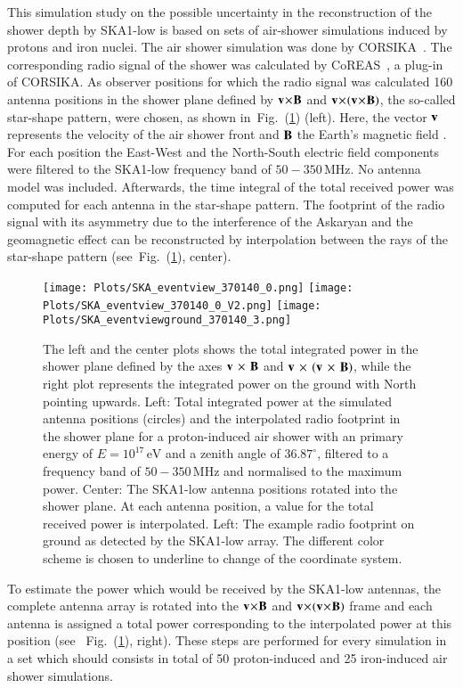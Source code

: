 \documentclass[epj]{webofc}
\newcommand*{\figref}[1]{Fig.~(\ref{fig:#1})}
\newcommand*{\figlab}[1]{\label{fig:#1}}
\begin{document}
This simulation study on the possible uncertainty in the reconstruction of the shower depth by SKA1-low is based on sets of air-shower simulations induced by protons and iron nuclei. The air shower simulation was done by CORSIKA~\cite{CORSIKA}. The corresponding radio signal of the shower was calculated by CoREAS~\cite{CoREAS}, a plug-in of CORSIKA. 
As observer positions for which the radio signal was calculated 160 antenna positions in the shower plane defined by $\bf v\!\times\!\bf B$ and $\bf v\!\times\!(\bf v\!\times\!\bf B)$, the so-called star-shape pattern, were chosen, as shown in~\figref{fig-1} (left). Here, the vector $\bf v$ represents the velocity of the air shower front and $\bf B$ the Earth's magnetic field .
For each position the East-West and the North-South electric field components were filtered to the SKA1-low frequency band of $50-350\,\mbox{MHz}$. No antenna model was included. Afterwards, the time integral of the total received power was computed for each antenna in the star-shape pattern. 
The footprint of the radio signal with its asymmetry due to the interference of the Askaryan and the geomagnetic effect can be reconstructed by interpolation between the rays of the star-shape pattern (see~\figref{fig-1}, center). 
%
\begin{figure}[tb]
\centering
\texttt{[image: Plots/SKA\_eventview\_370140\_0.png]}
\texttt{[image: Plots/SKA\_eventview\_370140\_0\_V2.png]}
\texttt{[image: Plots/SKA\_eventviewground\_370140\_3.png]}%
\caption{The left and the center plots shows the total integrated power in the shower plane defined by the axes $\bf v\,\times\,\bf B$ and $\bf v\,\times\,(\bf v\,\times\,\bf B)$, while the right plot represents the integrated power on the ground with North pointing upwards.  Left: Total integrated power at the simulated antenna positions (circles) and the interpolated radio footprint in the shower plane for a proton-induced air shower with an primary energy of $E=10^{17}\,\mbox{eV}$ and a zenith angle of $36.87^\circ$, filtered to a frequency band of $50-350\,\mbox{MHz}$ and normalised to the maximum power. Center: The SKA1-low antenna positions rotated into the shower plane. At each antenna position, a value for the total received power is interpolated. Left: The example radio footprint on ground as detected by the SKA1-low array. The different color scheme is chosen to underline to change of the coordinate system.}
\figlab{fig-1}       %
\end{figure}
%
To estimate the power which would be received by the SKA1-low antennas, the complete antenna array is rotated into the $\bf v\!\times\!\bf B$ and $\bf v\!\times\!(\bf v\!\times\!\bf B)$ frame and each antenna is assigned a total power corresponding to the interpolated power at this position (see ~\figref{fig-1}, right). These steps are performed for every simulation in a set which should consists in total of 50 proton-induced and 25 iron-induced air shower simulations.
\end{document}
